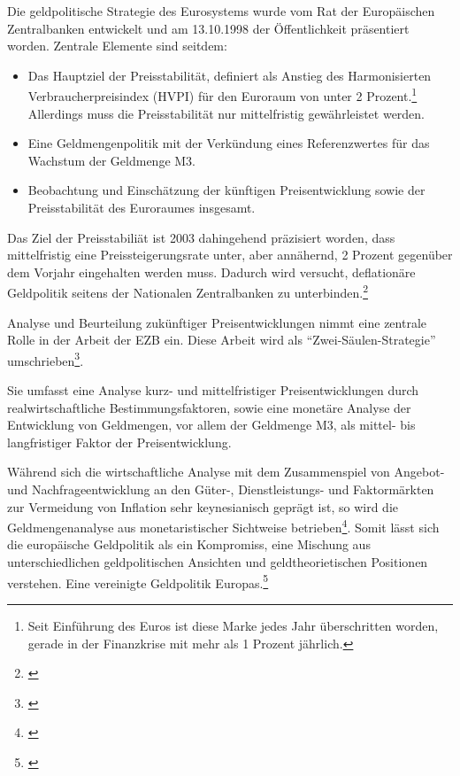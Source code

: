 \documentclass[
        onecolumn,
        a4paper,
        abstracton,
        parskip=half
        ,final
        ]{scrartcl}
\begin{document}
Die geldpolitische Strategie des Eurosystems wurde vom Rat der Europ{\"a}ischen Zentralbanken entwickelt und am 13.10.1998 der {\"O}ffentlichkeit pr{\"a}sentiert worden.
Zentrale Elemente sind seitdem:
\begin{itemize}
 \item Das Hauptziel der Preisstabilit{\"a}t, definiert als Anstieg des Harmonisierten Verbraucherpreisindex (HVPI) f{\"u}r den Euroraum von unter 2 Prozent.\footnote[78]{Seit Einf{\"u}hrung des Euros ist diese Marke  jedes Jahr {\"u}berschritten worden, gerade in der Finanzkrise mit mehr als 1 Prozent j{\"a}hrlich.} Allerdings muss die Preisstabilit{\"a}t nur mittelfristig gew{\"a}hrleistet werden.
 \item Eine Geldmengenpolitik mit der Verk{\"u}ndung eines Referenzwertes f{\"u}r das Wachstum der Geldmenge M3.
 \item Beobachtung und Einsch{\"a}tzung der k{\"u}nftigen Preisentwicklung sowie der Preisstabilit{\"a}t des Euroraumes insgesamt.
\end{itemize}

Das Ziel der Preisstabili{\"a}t ist 2003 dahingehend pr{\"a}zisiert worden, dass mittelfristig eine Preissteigerungsrate unter, aber ann{\"a}hernd, 2 Prozent gegen{\"u}ber dem Vorjahr eingehalten werden muss. Dadurch wird versucht, deflation{\"a}re Geldpolitik seitens der Nationalen Zentralbanken zu unterbinden.\footnote[101]{\citep*[vgl.][S.564-568]{Basseler2010}}


Analyse und Beurteilung zuk{\"u}nftiger Preisentwicklungen nimmt eine zentrale Rolle in der Arbeit der EZB ein. Diese Arbeit wird als  "`Zwei-S{\"a}ulen-Strategie"' umschrieben\footnote[95]{\citep*[S.568]{Basseler2010}}.

Sie umfasst eine Analyse kurz- und mittelfristiger Preisentwicklungen durch realwirtschaftliche Bestimmungsfaktoren, sowie eine monet{\"a}re Analyse der Entwicklung von Geldmengen, vor allem der Geldmenge M3, als mittel- bis langfristiger Faktor der Preisentwicklung.

W{\"a}hrend sich die wirtschaftliche Analyse mit dem Zusammenspiel von Angebot- und Nachfrageentwicklung an den G{\"u}ter-, Dienstleistungs- und Faktorm{\"a}rkten zur Vermeidung von Inflation sehr keynesianisch gepr{\"a}gt ist, so wird die Geldmengenanalyse aus monetaristischer Sichtweise betrieben\footnote[97]{\citep*[S.568]{Basseler2010}}. Somit l{\"a}sst sich die europ{\"a}ische Geldpolitik als ein Kompromiss, eine Mischung aus unterschiedlichen geldpolitischen Ansichten und geldtheorietischen Positionen verstehen. Eine vereinigte Geldpolitik Europas.\footnote[99]{\citep*[vgl.][S.558f]{Basseler2010}}
\end{document}

